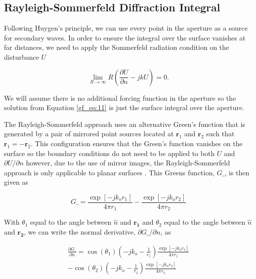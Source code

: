 \subsection{Rayleigh-Sommerfeld Diffraction Integral}
Following Huygen's principle, we can use every point in the aperture as a source for secondary waves. In order to ensure the integral over the surface vanishes at far distances, we need to apply the Sommerfeld radiation condition on the disturbance $U$

\begin{equation}
 \lim_{R\to\infty} R\left(\frac{\partial U}{\partial n} -jkU \right) = 0.
\label{gf_eq:48}
\end{equation}
\renewcommand{\baselinestretch}{2} \small\normalsize

We will assume there is no additional forcing function in the aperture so the solution from Equation \ref{gf_eq:11} is just the surface integral over the aperture.

The Rayleigh-Sommerfeld approach uses an alternative Green's function that is generated by a pair of mirrored point sources located at $\mathbf{r}_1$ and $\mathbf{r}_2$ such that $\mathbf{r}_1 = -\mathbf{r}_2$. This configuration ensures that the Green's function vanishes on the surface so the boundary conditions do not need to be applied to both $U$ and $\partial U/\partial n$ however, due to the use of mirror images, the Rayleigh-Sommerfeld approach is only applicable to planar surfaces \cite{goodman_fourier}. This Greens function, $G\_$, is then given as

\begin{equation}
G\_= \frac{\exp[-jk_or_1]}{4\pi r_1} - \frac{\exp[-jk_or_2]}{4\pi r_2}
\label{gf_eq:49}
\end{equation}
\renewcommand{\baselinestretch}{2} \small\normalsize

With $\theta_1$ equal to the angle between $\hat{n}$ and $\mathbf{r_1}$ and $\theta_2$ equal to the angle between $\hat{n}$ and $\mathbf{r_2}$, we can write the normal derivative, $\partial G\_/\partial n$, as 

\begin{equation}
\begin{gathered}
\frac{\partial G\_}{\partial n}
=\cos(\theta_1)\left(-jk_o - \frac{1}{r_1} \right)\frac{\exp[-jk_or_1]}{4\pi r_1} \\
-\cos(\theta_2)\left(-jk_o - \frac{1}{r_2} \right)\frac{\exp[-jk_or_2]}{4\pi r_2}\\
\end{gathered}
\label{gf_eq:50}
\end{equation}
\renewcommand{\baselinestretch}{2} \small\normalsize


